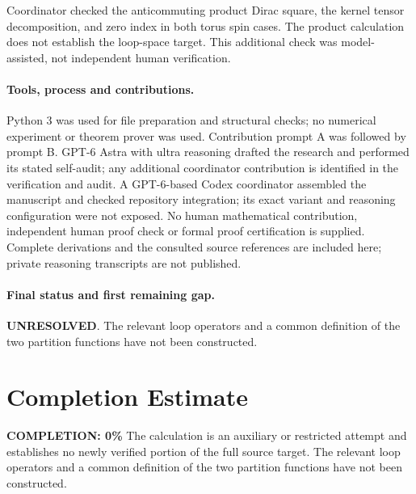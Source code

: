 \documentclass[11pt]{article}
\begin{document}
Coordinator checked the anticommuting product Dirac square, the kernel tensor decomposition, and zero index in both torus spin cases. The product calculation does not establish the loop-space target. This additional check was model-assisted, not independent human verification.

\paragraph{Tools, process and contributions.}
Python 3 was used for file preparation and structural checks; no numerical experiment or theorem prover was used. Contribution prompt A was followed by prompt B. GPT-6 Astra with ultra reasoning drafted the research and performed its stated self-audit; any additional coordinator contribution is identified in the verification and audit. A GPT-6-based Codex coordinator assembled the manuscript and checked repository integration; its exact variant and reasoning configuration were not exposed. No human mathematical contribution, independent human proof check or formal proof certification is supplied. Complete derivations and the consulted source references are included here; private reasoning transcripts are not published.

\paragraph{Final status and first remaining gap.}
\textbf{UNRESOLVED}. The relevant loop operators and a common definition of the two partition functions have not been constructed.

\section{Completion Estimate}
\noindent\textbf{COMPLETION: 0\%}
The calculation is an auxiliary or restricted attempt and establishes no newly verified portion of the full source target. The relevant loop operators and a common definition of the two partition functions have not been constructed.
\end{document}

